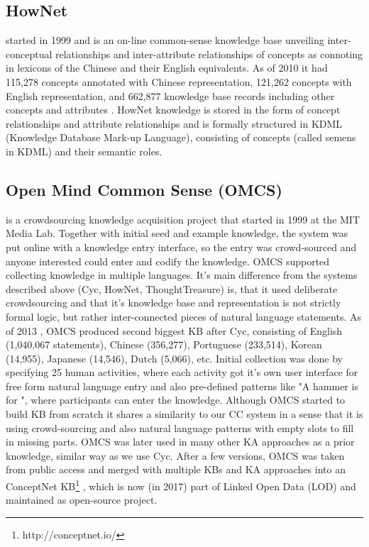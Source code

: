 \subsection{HowNet} started in 1999 and is an on-line common-sense knowledge base 
unveiling inter-conceptual relationships and inter-attribute relationships of 
concepts as connoting in lexicons of the Chinese and their English equivalents. 
As of 2010 it had 115,278 concepts annotated with Chinese representation, 
121,262 concepts with English representation, and 662,877 knowledge base records
including other concepts and attributes \parencite{Dong2010}. HowNet knowledge 
is stored in the form of concept relationships and attribute relationships and 
is formally structured in KDML (Knowledge Database Mark-up Language), consisting
of concepts (called semens in KDML) and their semantic roles.
 
\subsection{Open Mind Common Sense (OMCS)} is a crowdsourcing knowledge acquisition 
project that started in 1999 at the MIT Media Lab\parencite{Singh2002a}. 
Together with initial seed and example knowledge, the system was put online with
a knowledge entry interface, so the entry was crowd-sourced and anyone 
interested could enter and codify the knowledge. OMCS supported collecting 
knowledge in multiple languages. It's main difference from the systems described
above (Cyc, HowNet, ThoughtTreasure) is, that it used deliberate crowdsourcing
and that it's knowledge base and representation is not strictly formal logic, 
but rather inter-connected pieces of natural language statements. As of 2013 
\parencite{Zang2013}, OMCS produced second biggest KB after Cyc, consisting of 
English (1,040,067 statements), Chinese (356,277), Portuguese (233,514), 
Korean (14,955), Japanese (14,546), Dutch (5,066), etc. Initial collection was
done by specifying 25 human activities, where each activity got it's own user 
interface for free form natural language entry and also pre-defined patterns 
like "A hammer is for \underline{\hspace{1.5cm}}", where participants can enter
the knowledge. Although OMCS started to build KB from scratch it shares a 
similarity to our CC system in a sense that it is using crowd-sourcing and also
natural language patterns with empty slots to fill in missing parts. OMCS was
later used in many other KA approaches as a prior knowledge, similar way as we 
use Cyc. After a few versions, OMCS was taken from public access and merged with
multiple KBs and KA approaches into an ConceptNet 
KB\footnote{http://conceptnet.io/} \parencite{Speer2016}, which is now (in 2017)
part of Linked Open Data (LOD) and maintained as open-source project.

